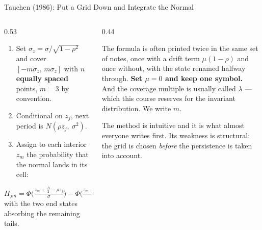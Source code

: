 \begin{frame}{Tauchen (1986): Put a Grid Down and Integrate the Normal}
\begin{columns}[T]
\begin{column}{0.53\textwidth}
\small
\begin{enumerate}\footnotesize
  \item Set $\sigma_z=\sigma/\sqrt{1-\rho^{2}}$ and cover $[-m\sigma_z,\,m\sigma_z]$ with $n$ \textbf{equally spaced} points, $m=3$ by convention.
  \item Conditional on $z_j$, next period is $N(\rho z_j,\ \sigma^{2})$.
  \item Assign to each interior $z_m$ the probability that the normal lands in its cell:
\end{enumerate}
\[
  \Pi_{jm}=\Phi\!\Big(\tfrac{z_m+\frac{\Delta}{2}-\rho z_j}{\sigma}\Big)
          -\Phi\!\Big(\tfrac{z_m-\frac{\Delta}{2}-\rho z_j}{\sigma}\Big),
\]
with the two end states absorbing the remaining tails.
\end{column}
\begin{column}{0.44\textwidth}
\begin{cautionbox}[title=\textbf{Two things to fix on sight}]\footnotesize
The formula is often printed twice in the same set of notes, once with a drift term $\mu(1-\rho)$ and once without, with the state renamed halfway through. \textbf{Set $\mu=0$ and keep one symbol.}\\[1mm]
And the coverage multiple is usually called $\lambda$ --- which this course reserves for the invariant distribution. We write $m$.
\end{cautionbox}
\medskip
\begin{examplebox}\footnotesize
The method is intuitive and it is what almost everyone writes first. Its weakness is structural: the grid is chosen \emph{before} the persistence is taken into account.
\end{examplebox}
\end{column}
\end{columns}
\vspace{1mm}
\end{frame}

